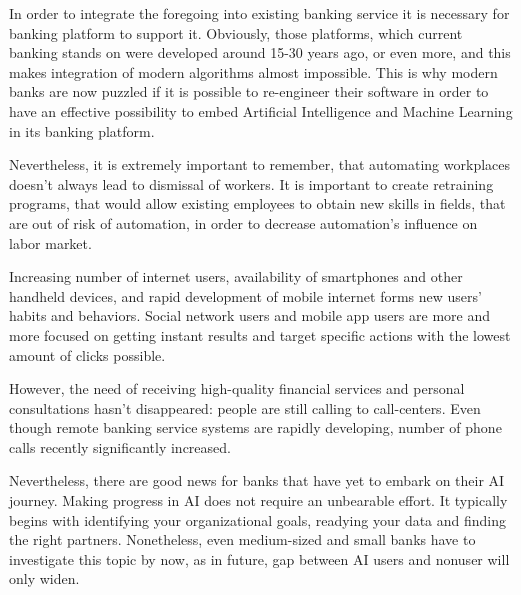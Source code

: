In order to integrate the foregoing into existing banking service it is necessary for banking platform to support it.
Obviously, those platforms, which current banking stands on were developed around 15-30 years ago, or even more, and this makes integration of modern algorithms almost impossible. 
This is why modern banks are now puzzled if it is possible to re-engineer their software in order to have an effective possibility to embed Artificial Intelligence and Machine Learning in its banking platform.

Nevertheless, it is extremely important to remember, that automating workplaces doesn't always lead to dismissal of workers.
It is important to create retraining programs, that would allow existing employees to obtain new skills in fields,
that are out of risk of automation, in order to decrease automation's influence on labor market.

Increasing number of internet users, availability of smartphones and other handheld devices, and rapid development of mobile internet forms new users' habits and behaviors.
Social network users and mobile app users are more and more focused on getting instant results and target specific actions with the lowest amount of clicks possible.

However, the need of receiving high-quality financial services and personal consultations hasn't disappeared: people are still calling to call-centers.
Even though remote banking service systems are rapidly developing, number of phone calls recently significantly increased. 

Nevertheless, there are good news for banks that have yet to embark on their AI journey. 
Making progress in AI does not require an unbearable effort.
It typically begins with identifying your organizational goals, readying your data and finding the right partners.
Nonetheless, even medium-sized and small banks have to investigate this topic by now, as in future, gap between AI users and nonuser will only widen.





